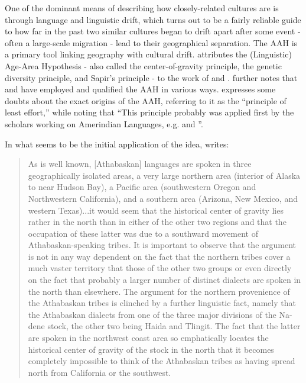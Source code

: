 \documentclass[11pt]{article}
\begin{document}
One of the dominant means of describing how closely-related cultures are is through language and linguistic drift, which turns out to be a fairly reliable guide to how far in the past two similar cultures began to drift apart after some event - often a large-scale migration - lead to their geographical separation. The AAH is a primary tool linking geography with cultural drift. \citet[p.12]{trask00} attributes the (Linguistic) Age-Area Hypothesis - also called the center-of-gravity principle, the genetic diversity principle, and Sapir's principle - to the work of \cite{latham51}  and \cite{sapir16}. \cite{trask00} further notes that \cite{mallory97} and \cite{nichols97} have employed and qualified the AAH in various ways.   \citet[p.336]{dimmendaal11} expresses some doubts about the exact origins of the AAH, referring to it as the ``principle of least effort,'' while noting that ``This principle probably was applied first by the scholars working on Amerindian Languages, e.g. \cite{sapir16} and \cite{dyen56}''.

In what seems to be the initial application of the idea, \cite{sapir16} writes:

\begin{quote}
 As is well known, [Athabaskan] languages are spoken in three geographically isolated areas, a very large northern area (interior of Alaska to near Hudson Bay), a Pacific area (southwestern Oregon and Northwestern California), and a southern area (Arizona, New Mexico, and western Texas)...it would seem that the historical center of gravity lies rather in the north than in either of the other two regions and that the occupation of these latter was due to a southward movement of Athabaskan-speaking tribes. It is important to observe that the argument is not in any way dependent on the fact that the northern tribes cover a much vaster territory that those of the other two groups or even directly on the fact that probably a larger number of distinct dialects are spoken in the north than elsewhere. The argument for the northern provenience of the Athabaskan tribes is clinched by a further linguistic fact, namely that the Athabaskan dialects from one of the three major divisions of the Na-dene stock, the other two being Haida and Tlingit. The fact that the latter are spoken in the northwest coast area so emphatically locates the historical center of gravity of the stock in the north that it becomes completely impossible to think of the Athabaskan tribes as having spread north from California or the southwest. 
\end{quote}
\end{document}

